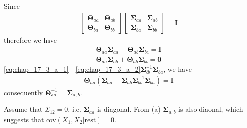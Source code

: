 \begin{exercise}
  \begin{exerciseSection}
    Since
    \begin{align}
      \left[
        \begin{array}{cc}
          \mathbf{\Theta}_{aa} & \mathbf{\Theta}_{ab} \\
          \mathbf{\Theta}_{ba} & \mathbf{\Theta}_{bb}
        \end{array}
      \right]
      \left[
        \begin{array}{cc}
          \mathbf{\Sigma}_{aa} & \mathbf{\Sigma}_{ab} \\
          \mathbf{\Sigma}_{ba} & \mathbf{\Sigma}_{bb}
        \end{array}
      \right] = \mathbf{I}
    \end{align}
    therefore we have
    \begin{subequations}
      \begin{align}
        \mathbf{\Theta}_{aa}\mathbf{\Sigma}_{aa} +
        \mathbf{\Theta}_{ab}\mathbf{\Sigma}_{ba} = \mathbf{I}
        \label{eq:chap_17_3_a_1}
        \\
        \mathbf{\Theta}_{aa}\mathbf{\Sigma}_{ab} +
        \mathbf{\Theta}_{ab}\mathbf{\Sigma}_{bb} = \mathbf{0}
        \label{eq:chap_17_3_a_2}
      \end{align}
    \end{subequations}
    \eqref{eq:chap_17_3_a_1} -
    \eqref{eq:chap_17_3_a_2}$\mathbf{\Sigma}_{bb}^{-1}\mathbf{\Sigma}_{ba}$, we
    have
    \begin{align}
      \mathbf{\Theta}_{aa}\left(\mathbf{\Sigma}_{aa} -
      \mathbf{\Sigma}_{ab} \mathbf{\Sigma}_{bb}^{-1}\mathbf{\Sigma}_{ba} \right)
      = \mathbf{I}
    \end{align}
    consequently $\mathbf{\Theta}_{aa}^{-1} = \mathbf{\Sigma}_{a, b}$.
  \end{exerciseSection}
  
  \begin{exerciseSection}
    Assume that $\Sigma_{12} = 0$, i.e. $\mathbf{\Sigma}_{aa}$ is diagonal. From
    (a) $\mathbf{\Sigma}_{a, b}$ is also diaonal, which suggests that
    $\mbox{cov}(X_1, X_2|\mbox{rest}) = 0$.
  \end{exerciseSection}
  

\end{exercise}
